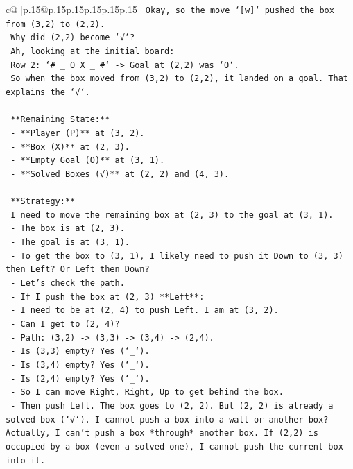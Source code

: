 \documentclass{article}
\begin{document}
{\begin{supertabular}{c@{$\;$}|p{.15\linewidth}@{}p{.15\linewidth}p{.15\linewidth}p{.15\linewidth}p{.15\linewidth}p{.15\linewidth}}
{{{\texttt{    Okay, so the move `{[}w{]}` pushed the box from (3,2) to (2,2).} \\
\texttt{    Why did (2,2) become `√`?} \\
\texttt{    Ah, looking at the initial board:} \\
\texttt{    Row 2: `\# \_ O X \_ \#` {-}> Goal at (2,2) was `O`.} \\
\texttt{    So when the box moved from (3,2) to (2,2), it landed on a goal. That explains the `√`.} \\
\\ 
\texttt{    **Remaining State:**} \\
\texttt{    {-} **Player (P)** at (3, 2).} \\
\texttt{    {-} **Box (X)** at (2, 3).} \\
\texttt{    {-} **Empty Goal (O)** at (3, 1).} \\
\texttt{    {-} **Solved Boxes (√)** at (2, 2) and (4, 3).} \\
\\ 
\texttt{    **Strategy:**} \\
\texttt{    I need to move the remaining box at (2, 3) to the goal at (3, 1).} \\
\texttt{    {-} The box is at (2, 3).} \\
\texttt{    {-} The goal is at (3, 1).} \\
\texttt{    {-} To get the box to (3, 1), I likely need to push it Down to (3, 3) then Left? Or Left then Down?} \\
\texttt{    {-} Let's check the path.} \\
\texttt{    {-} If I push the box at (2, 3) **Left**:} \\
\texttt{      {-} I need to be at (2, 4) to push Left. I am at (3, 2).} \\
\texttt{      {-} Can I get to (2, 4)?} \\
\texttt{      {-} Path: (3,2) {-}> (3,3) {-}> (3,4) {-}> (2,4).} \\
\texttt{      {-} Is (3,3) empty? Yes (`\_`).} \\
\texttt{      {-} Is (3,4) empty? Yes (`\_`).} \\
\texttt{      {-} Is (2,4) empty? Yes (`\_`).} \\
\texttt{      {-} So I can move Right, Right, Up to get behind the box.} \\
\texttt{      {-} Then push Left. The box goes to (2, 2). But (2, 2) is already a solved box (`√`). I cannot push a box into a wall or another box? Actually, I can't push a box *through* another box. If (2,2) is occupied by a box (even a solved one), I cannot push the current box into it.} \\
}}}
\end{supertabular}}
\end{document}
